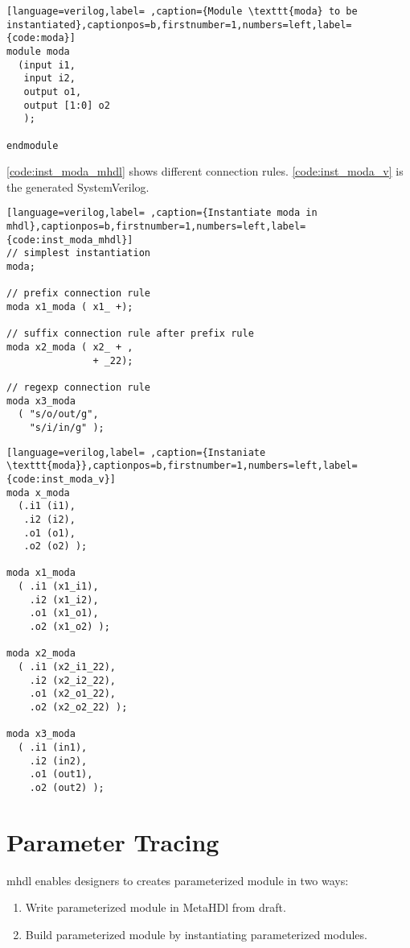 \documentclass[10pt,oneside]{book}
\begin{document}
\begin{lstlisting}[language=verilog,label= ,caption={Module \texttt{moda} to be instantiated},captionpos=b,firstnumber=1,numbers=left,label={code:moda}]
module moda
  (input i1,
   input i2, 
   output o1, 
   output [1:0] o2
   );

endmodule
\end{lstlisting}

\autoref{code:inst_moda_mhdl} shows different connection rules.
\autoref{code:inst_moda_v} is the generated SystemVerilog. 

\begin{lstlisting}[language=verilog,label= ,caption={Instantiate moda in mhdl},captionpos=b,firstnumber=1,numbers=left,label={code:inst_moda_mhdl}]
// simplest instantiation
moda;

// prefix connection rule
moda x1_moda ( x1_ +);

// suffix connection rule after prefix rule
moda x2_moda ( x2_ + , 
               + _22);

// regexp connection rule
moda x3_moda
  ( "s/o/out/g", 
    "s/i/in/g" );
\end{lstlisting}


\begin{lstlisting}[language=verilog,label= ,caption={Instaniate \texttt{moda}},captionpos=b,firstnumber=1,numbers=left,label={code:inst_moda_v}]
moda x_moda
  (.i1 (i1),
   .i2 (i2),
   .o1 (o1),
   .o2 (o2) );

moda x1_moda
  ( .i1 (x1_i1),
    .i2 (x1_i2),
    .o1 (x1_o1),
    .o2 (x1_o2) );

moda x2_moda
  ( .i1 (x2_i1_22),
    .i2 (x2_i2_22),
    .o1 (x2_o1_22),
    .o2 (x2_o2_22) );

moda x3_moda
  ( .i1 (in1),
    .i2 (in2),
    .o1 (out1),
    .o2 (out2) );
\end{lstlisting}

\section{Parameter Tracing}
\label{sec:org972f3d1}
mhdl enables designers to creates parameterized module in two ways:
\begin{enumerate}
\item Write parameterized module in MetaHDl from draft.
\item Build parameterized module by instantiating parameterized modules.
\end{enumerate}
\end{document}
